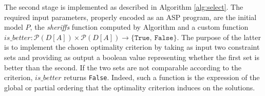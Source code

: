 \documentclass[a4wide,11pt]{article}
\theoremstyle{definition}
\theoremstyle{plain}
\newcommand{\sheriff}{sheriffs}
\begin{document}

The second stage is implemented as described in Algorithm \ref{alg:select}. The required input parameters, properly encoded as an \ac{ASP} program, are the initial model $P$, the \textit{\sheriff} function computed by Algorithm \label{alg:cand} and a custom function ${is\_better}:\mathcal{P}({D[A]})\times\mathcal{P}({D[A]})\rightarrow \{\texttt{True},\ \texttt{False}\}$. The purpose of the latter is to implement the chosen optimality criterion by taking as input two constraint sets and providing as output a boolean value representing whether the first set is better than the second. If the two sets are not comparable according to the criterion, ${is\_better}$ returns \texttt{False}. Indeed, such a function is the expression of the global or partial ordering that the optimality criterion induces on the solutions. 



\end{document}
